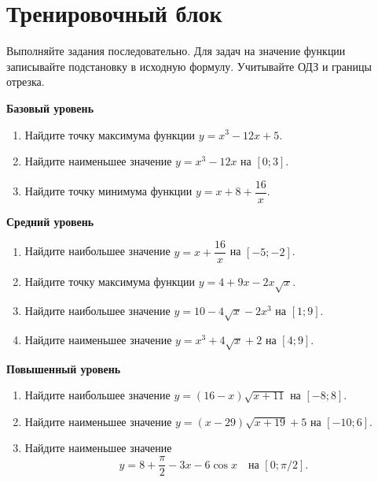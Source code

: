 \documentclass[a4paper,12pt]{article}
\newcommand{\key}[1]{\par\smallskip\textcolor{darkaccent}{\textbf{#1}}\par\smallskip}
\begin{document}
\section*{\textcolor{darkaccent}{Тренировочный блок}}
Выполняйте задания последовательно. Для задач на значение функции записывайте подстановку в исходную формулу. Учитывайте ОДЗ и границы отрезка.
\key{Базовый уровень}
\begin{enumerate}
\item Найдите точку максимума функции $y=x^3-12x+5$.
\item Найдите наименьшее значение $y=x^3-12x$ на $[0;3]$.
\item Найдите точку минимума функции $y=x+8+\dfrac{16}{x}$.
\end{enumerate}
\key{Средний уровень}
\begin{enumerate}[resume]
\item Найдите наибольшее значение $y=x+\dfrac{16}{x}$ на $[-5;-2]$.
\item Найдите точку максимума функции $y=4+9x-2x\sqrt{x}$.
\item Найдите наибольшее значение $y=10-4\sqrt{x}-2x^3$ на $[1;9]$.
\item Найдите наименьшее значение $y=x^3+4\sqrt{x}+2$ на $[4;9]$.
\end{enumerate}
\key{Повышенный уровень}
\begin{enumerate}[resume]
\item Найдите наибольшее значение $y=(16-x)\sqrt{x+11}$ на $[-8;8]$.
\item Найдите наименьшее значение $y=(x-29)\sqrt{x+19}+5$ на $[-10;6]$.
\item Найдите наименьшее значение
\[y=8+\frac\pi2-3x-6\cos x\quad\text{на }[0;\pi/2].\]
\end{enumerate}
\clearpage
\end{document}
